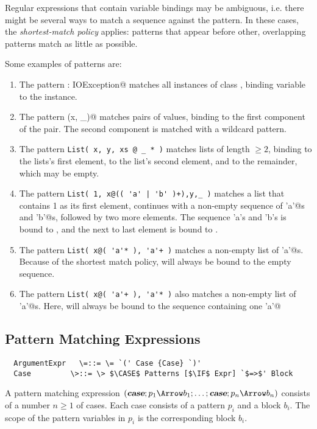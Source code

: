 \documentclass[11pt]{report}
\begin{document}
Regular expressions that contain variable bindings may be ambiguous,
i.e. there might be several ways to match a sequence against the
pattern. In these cases, the \emph{shortest-match policy} applies:
patterns that appear before other, overlapping patterns match
as little as possible.

\example Some examples of patterns are:
\begin{enumerate}
\item
The pattern \verb@ex: IOException@ matches all instances of class
\verb@IOException@, binding variable \verb@ex@ to the instance.
\item
The pattern \verb@(x, _)@ matches pairs of values, binding \verb@x@ to
the first component of the pair. The second component is matched
with a wildcard pattern.
\item
The pattern \verb+List( x, y, xs @ _ * )+ matches lists of length $\geq 2$,
binding \verb@x@ to the lists's first element, \verb@y@ to the list's
second element, and \verb@xs@ to the remainder, which may be empty.
\item
The pattern \verb=List( 1, x@(( 'a' | 'b' )+),y,_ )= matches a list that
contains 1 as its first element, continues with a non-empty sequence of 
\verb@'a'@s and \verb@'b'@s, followed by two more elements. The sequence 'a's and 'b's
is bound to \verb@x@, and the next to last element is bound to \verb@y@.
\item
The pattern \verb=List( x@( 'a'* ), 'a'+ )= matches a non-empty list of
\verb@'a'@s. Because of the shortest match policy, \verb@x@ will always be bound to
the empty sequence.
\item
The pattern \verb=List( x@( 'a'+ ), 'a'* )= also matches a non-empty list of
\verb@'a'@s. Here, \verb@x@ will always be bound to
the sequence containing one \verb@'a'@
\end{enumerate}

\subsection{Pattern Matching Expressions}
\label{sec:pattern-match}

\syntax\begin{verbatim}
  ArgumentExpr   \=::= \= `(' Case {Case} `)'
  Case	       \>::= \> $\CASE$ Patterns [$\IF$ Expr] `$=>$' Block
\end{verbatim}

A pattern matching expression $(\CASE;p_1 \Arrow b_1 ;\ldots; \CASE;p_n
\Arrow b_n)$ consists of a number $n \geq 1$ of cases.  Each case
consists of a pattern $p_i$ and a block $b_i$.  The scope
of the pattern variables in $p_i$ is the corresponding block
$b_i$.
\end{document}
